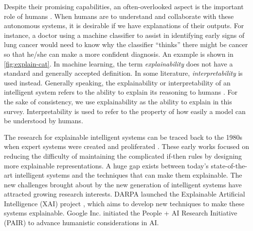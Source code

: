 Despite their promising capabilities, an often-overlooked aspect is the important role of humans \cite{ribeiro2016kdd}. When humans are to understand and collaborate with these autonomous systems, it is desirable if we have explanations of their outputs. For instance, a doctor using a machine classifier to assist in identifying early signs of lung cancer would need to know why the classifier ``thinks'' there might be cancer so that he/she can make a more confident diagnosis. An example is shown in \autoref{fig:explain-cat}. In machine learning, the term \textit{explainability} does not have a standard and generally accepted definition. In some literature, \textit{interpretability} is used instead. Generally speaking, the explainability or interpretability of an intelligent system refers to the ability to explain its reasoning to humans \cite{doshi-velez2017interpretableml}. For the sake of consistency, we use explainability as the ability to explain in this survey. Interpretability is used to refer to the property of how easily a model can be understood by humans.

The research for explainable intelligent systems can be traced back to the 1980s when expert systems were created and proliferated \cite{clancey1981tech, neches1985tse, swartout1991expert}. These early works focused on reducing the difficulty of maintaining the complicated if-then rules by designing more explainable representations. 
A huge gap exists between today's state-of-the-art intelligent systems and the techniques that can make them explainable. The new challenges brought about by the new generation of intelligent systems have attracted growing research interests. DARPA launched the Explainable Artificial Intelligence (XAI) project \cite{darpa2017xai}, which aims to develop new techniques to make these systems explainable. Google Inc. initiated the People + AI Research Initiative (PAIR) \cite{google2017pair} to advance humanistic considerations in AI. 


